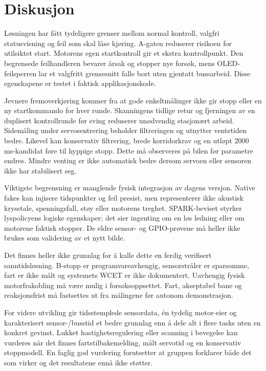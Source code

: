 \chapter{Diskusjon}
Løsningen har fått tydeligere grenser mellom normal kontroll, valgfri
statusvisning og feil som skal låse kjøring. A-gaten reduserer risikoen for
utilsiktet start. Motorens egen startkontroll gir et ekstra kontrollpunkt.
Den begrensede feilhandleren bevarer årsak og stopper nye forsøk, mens
OLED-feilsperren lar et valgfritt grensesnitt falle bort uten gjentatt
bussarbeid. Disse egenskapene er testet i faktisk applikasjonskode.

Jevnere fremoverkjøring kommer fra at gode enkeltmålinger ikke gir stopp
eller en ny startkommando for hver runde. Skanningens tidlige retur og
fjerningen av en duplisert kontrollrunde før sving reduserer unødvendig
stasjonært arbeid. Sidemåling under servosentrering beholder filtreringen
og utnytter ventetiden bedre. Likevel kan konservativ filtrering, brede korridorkrav
og en utløpt 2000 ms-kandidat føre til hyppige stopp. Dette må observeres
på bilen før parametre endres. Mindre venting er ikke automatisk bedre
dersom servoen eller sensoren ikke har stabilisert seg.

Viktigste begrensning er manglende fysisk integrasjon av dagens versjon.
Native fakes kan injisere tidspunkter og feil presist, men representerer
ikke akustisk krysstale, spenningsfall, støy eller motorens treghet.
SPARK-beviset styrker lyspolicyens logiske egenskaper; det sier ingenting
om en løs ledning eller om motorene faktisk stopper. De eldre sensor-
og GPIO-prøvene må heller ikke brukes som validering av et nytt bilde.

Det finnes heller ikke grunnlag for å kalle dette en ferdig verifisert
sanntidsløsning. B-stopp er programvareavhengig, sensorstråler er sparsomme,
fart er ikke målt og systemets WCET er ikke dokumentert. Uavhengig fysisk
motorfrakobling må være mulig i forsøksoppsettet. Fart, akseptabel bane og
reaksjonsfrist må fastsettes ut fra målingene før autonom demonstrasjon.

For videre utvikling gir tidsstemplede sensordata, én tydelig motor-eier
og karakterisert sensor-/busstid et bedre grunnlag enn å dele alt i flere
tasks uten en konkret gevinst. Lukket hastighetsregulering eller scanning
i bevegelse kan vurderes når det finnes fartstilbakemelding, målt
servotid og en konservativ stoppmodell. En faglig god vurdering forutsetter
at gruppen forklarer både det som virker og det resultatene ennå ikke støtter.
